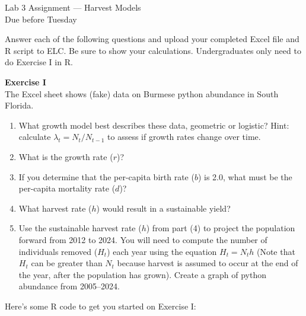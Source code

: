 \documentclass[12pt]{article}\usepackage[]{graphicx}\usepackage[]{color}
\begin{document}
{
  \Large
  \centering
  Lab 3 Assignment --- Harvest Models \\
  Due before Tuesday \par
}

Answer each of the following questions and upload your completed Excel
file and R script to ELC. Be sure to show your calculations. Undergraduates
only need to do Exercise I in R.

\vspace{12pt}

{\bf Exercise I \\}
The Excel sheet shows (fake) data on Burmese python abundance in South Florida.
\begin{enumerate}
  \item What growth model best describes these data, geometric or
    logistic?  Hint: calculate $\lambda_t = N_t/N_{t-1}$ to assess if
    growth rates change over time.
  \item What is the growth rate ($r$)?
  \item If you determine that the per-capita birth rate ($b$) is 2.0,
    what must be the per-capita mortality rate ($d$)?
  \item What harvest rate ($h$) would result in a sustainable yield?
  \item Use the sustainable harvest rate ($h$) from part (4) to project the population
    forward from 2012 to 2024. You will need to compute the number of
    individuals removed ($H_t$) each year using the equation
    $H_t=N_{t}h$ (Note that $H_t$ can be greater than $N_t$ because
      harvest is assumed to occur at the end of the year, after the
      population has grown). Create a graph of python abundance from
    2005--2024.  
\end{enumerate}

\vspace{24pt}

Here's some R code to get you started on Exercise I:
\end{document}
